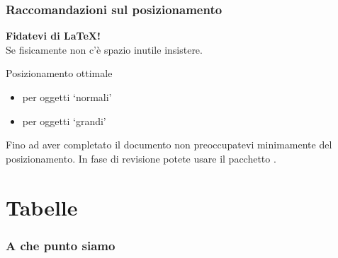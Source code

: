 \documentclass[svgnames,%
	ucs,%
	pdftex]{guitbeamer}
\begin{document}
\begin{frame}
  \frametitle{Raccomandazioni sul posizionamento}
	\begin{center}
		\textbf{Fidatevi di \LaTeX!}\\
		Se fisicamente non c'\`e spazio inutile insistere.
	\end{center}
  \medskip
	\begin{block}{Posizionamento ottimale}
		\begin{itemize}
			\item {} per oggetti `normali'
			\item {} per oggetti `grandi'
		\end{itemize}
	\end{block}
	Fino ad aver completato il documento non preoccupatevi minimamente del posizionamento. In fase di revisione potete usare il pacchetto .
\end{frame}
\section{Tabelle}
\begin{frame}
  \frametitle{A che punto siamo}
\end{frame}
\end{document}
